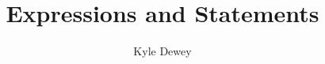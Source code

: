 \documentclass[10pt]{article}
\begin{document}
\title{Expressions and Statements}
\author{Kyle Dewey}
\date{}
\maketitle



\end{document}
